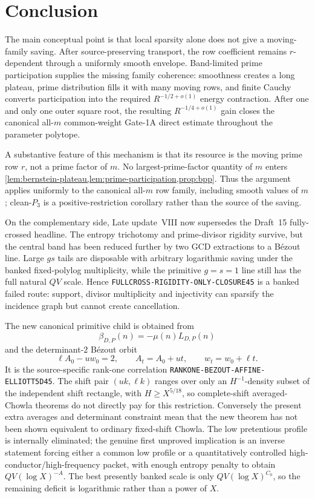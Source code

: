 \documentclass[11pt]{article}
\theoremstyle{definition}
\newcommand{\1}{\mathbf 1}
\begin{document}
\section{Conclusion}
The main conceptual point is that local sparsity alone does not give a
moving-family saving. After source-preserving transport, the row coefficient
remains $r$-dependent through a uniformly smooth envelope. Band-limited prime
participation supplies the missing family coherence: smoothness creates a long
plateau, prime distribution fills it with many moving rows, and finite Cauchy
converts participation into the required $R^{-1/2+o(1)}$ energy contraction.
After one and only one outer square root, the resulting $R^{-1/4+o(1)}$ gain
closes the canonical all-$m$ common-weight Gate-1A direct estimate throughout
the parameter polytope.

A substantive feature of this mechanism is that its resource is the moving
prime row $r$, not a prime factor of $m$.  No largest-prime-factor quantity of
$m$ enters \cref{lem:bernstein-plateau,lem:prime-participation,prop:bpp}.
Thus the argument applies uniformly to the canonical all-$m$ row family,
including smooth values of $m$; clean-$P_3$ is a positive-restriction
corollary rather than the source of the saving.


On the complementary side, Late update~VIII now supersedes the Draft~15
fully-crossed headline.  The entropy trichotomy and prime-divisor rigidity
survive, but the central band has been reduced further by two GCD extractions
to a B\'ezout line.  Large $gs$ tails are disposable with arbitrary logarithmic
saving under the banked fixed-polylog multiplicity, while the primitive
$g=s=1$ line still has the full natural $QV$ scale.  Hence
\texttt{FULLCROSS-RIGIDITY-ONLY-CLOSURE45} is a banked failed route: support,
divisor multiplicity and injectivity can sparsify the incidence graph but
cannot create cancellation.

The new canonical primitive child is obtained from
\[
 \beta_{D,P}(n)=-\mu(n)L_{D,P}(n)
\]
and the determinant-$2$ B\'ezout orbit
\[
 \ell A_0-u w_0=2,\qquad A_t=A_0+ut,\qquad w_t=w_0+\ell t.
\]
It is the source-specific rank-one correlation
\texttt{RANKONE-BEZOUT-AFFINE-ELLIOTT5D45}.  The shift pair
$(uk,\ell k)$ ranges over only an $H^{-1}$-density subset of the independent
shift rectangle, with $H\ge X^{5/18}$, so complete-shift averaged-Chowla
theorems do not directly pay for this restriction.  Conversely the present
extra averages and determinant constraint mean that the new theorem has not
been shown equivalent to ordinary fixed-shift Chowla.  The low pretentious
profile is internally eliminated; the genuine first unproved implication is
an inverse statement forcing either a common low profile or a quantitatively
controlled high-conductor/high-frequency packet, with enough entropy penalty
to obtain $QV(\log X)^{-A}$.  The best presently banked scale is only
$QV(\log X)^{C_0}$, so the remaining deficit is logarithmic rather than a
power of $X$.
\end{document}
